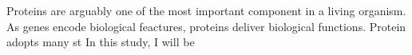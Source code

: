Proteins are arguably one of the most important component in a living organism. As genes encode biological feactures, proteins deliver biological functions. Protein adopts many st  In this study, I will be 